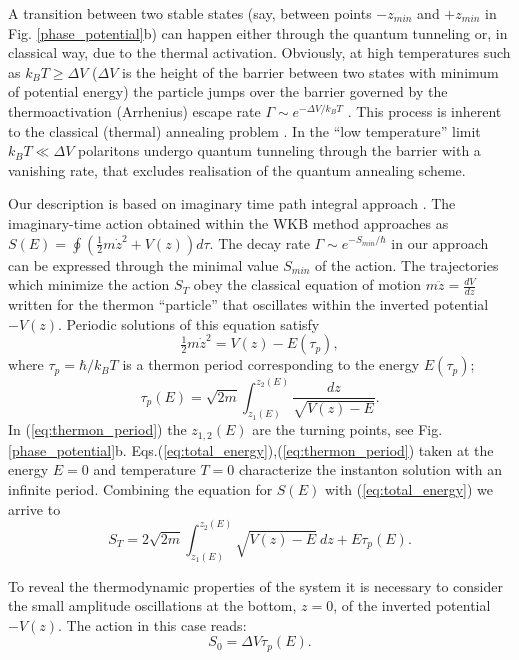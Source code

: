 \documentclass[aps, pre, preprint, groupedaddress, superscriptaddress, showkeys, showpacs] {revtex4-1}
\begin{document}
A transition between two stable states (say, between points $-z_{min}$ and $+z_{min}$ in Fig. \ref{phase_potential}b) can happen  either through the quantum tunneling or, in classical way, due to the thermal activation. 
Obviously, at high temperatures such as $k_{B}T\ge\Delta V$ ($\Delta V$ is the height of the barrier between two states with minimum of potential energy) the particle jumps over the barrier governed by the thermoactivation (Arrhenius) escape rate $\Gamma \sim e^{-\Delta V /k_{B}T}$ \cite{Larkin}. This process is inherent to the classical (thermal) annealing problem \cite{Das}. 
In the ``low temperature'' limit $k_{B}T\ll\Delta V$ polaritons undergo quantum tunneling through the barrier with a vanishing rate, that excludes realisation of the quantum annealing scheme.

Our description is based on imaginary time path integral approach \cite{Ankerhold}.
The imaginary-time action obtained within the WKB method approaches as $S(E) = \oint (\tfrac{1}{2} m \dot{z}^2 + V(z)) d \tau$.
The decay rate $\Gamma \sim e^{-S_{min}/\hbar}$ in our approach can be expressed through the minimal value $S_{min}$ of the action.
The trajectories which minimize the action $S_T$ obey the classical equation of motion $m \ddot{z} = \frac{d V}{dz}$ written for the thermon ``particle'' that oscillates within the inverted potential $-V(z)$.
Periodic solutions of this equation satisfy
%
\begin{equation}
\tfrac{1}{2} m \dot{z}^2 = V(z) - E(\tau_p),
\label{eq:total_energy}
\end{equation}
%
where $\tau_p = \hbar / k_B T$ is a thermon period corresponding to the energy $E(\tau_p)$;
%
\begin{equation}
\tau_p(E) = \sqrt{2 m} \int_{z_1(E)}^{z_2(E)} \frac{dz}{\sqrt{V(z) - E}}.
\label{eq:thermon_period}
\end{equation}
%
In (\ref{eq:thermon_period}) the $z_{1,2}(E)$ are the turning points, see Fig. \ref{phase_potential}b.
Eqs.(\ref{eq:total_energy}),(\ref{eq:thermon_period}) taken at the energy $E = 0$ and temperature $T = 0$ characterize the instanton solution with an infinite period.
Combining the equation for $S(E)$ 
with (\ref{eq:total_energy}) we arrive to 
%
\begin{equation}
S_T = 2 \sqrt{2 m} \int_{z_1(E)}^{z_2(E)} \sqrt{V(z) - E} ~dz + E \tau_p (E).
\label{eq:thermon_action_2}
\end{equation}
%

To reveal the thermodynamic properties of the system it is necessary to consider the small amplitude oscillations at the bottom, $z=0$, of the inverted potential $-V(z)$.
The action in this case reads: 
%
\begin{equation}
S_0 = \Delta V \tau_p (E).
\label{eq:thermal_action}
\end{equation}
%
\end{document}

